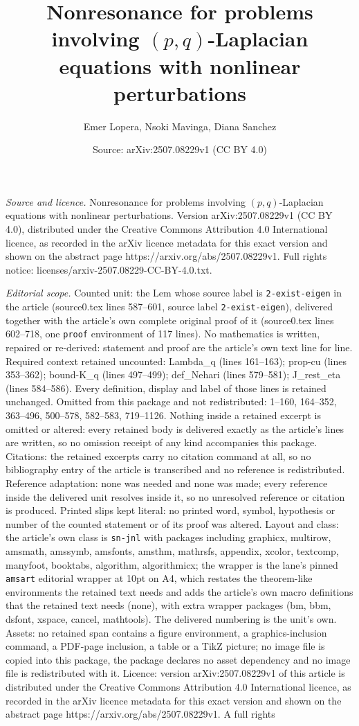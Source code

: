 \documentclass[10pt,a4paper]{amsart}
\title[Nonresonance for problems involving $(p,q)$-Laplacian equati]{Nonresonance for problems involving $(p,q)$-Laplacian equations with nonlinear perturbations}
\author{Emer Lopera, Nsoki Mavinga, Diana Sanchez}
\date{Source: arXiv:2507.08229v1 (CC BY 4.0)}
\begin{document}
\maketitle

\noindent\emph{Source and licence.} Nonresonance for problems involving $(p,q)$-Laplacian equations with nonlinear perturbations. Version arXiv:2507.08229v1 (CC BY 4.0), distributed under the Creative Commons Attribution 4.0 International licence, as recorded in the arXiv licence metadata for this exact version and shown on the abstract page https://arxiv.org/abs/2507.08229v1. Full rights notice: licenses/arxiv-2507.08229-CC-BY-4.0.txt.\par\smallskip

\noindent\textit{Editorial scope.} Counted unit: the Lem whose source label is \texttt{2-exist-eigen} in the article (source0.tex lines 587--601, source label \texttt{2-exist-eigen}), delivered together with the article's own complete original proof of it (source0.tex lines 602--718, one \texttt{proof} environment of 117 lines). No mathematics is written, repaired or re-derived: statement and proof are the article's own text line for line. Required context retained uncounted: Lambda\_q (lines 161--163); prop-cu (lines 353--362); bound-K\_q (lines 497--499); def\_Nehari (lines 579--581); J\_rest\_eta (lines 584--586). Every definition, display and label of those lines is retained unchanged. Omitted from this package and not redistributed: 1--160, 164--352, 363--496, 500--578, 582--583, 719--1126. Nothing inside a retained excerpt is omitted or altered: every retained body is delivered exactly as the article's lines are written, so no omission receipt of any kind accompanies this package. Citations: the retained excerpts carry no citation command at all, so no bibliography entry of the article is transcribed and no reference is redistributed. Reference adaptation: none was needed and none was made; every reference inside the delivered unit resolves inside it, so no unresolved reference or citation is produced. Printed slips kept literal: no printed word, symbol, hypothesis or number of the counted statement or of its proof was altered. Layout and class: the article's own class is \texttt{sn-jnl} with packages including graphicx, multirow, amsmath, amssymb, amsfonts, amsthm, mathrsfs, appendix, xcolor, textcomp, manyfoot, booktabs, algorithm, algorithmicx; the wrapper is the lane's pinned \texttt{amsart} editorial wrapper at 10pt on A4, which restates the theorem-like environments the retained text needs and adds the article's own macro definitions that the retained text needs (none), with extra wrapper packages (bm, bbm, dsfont, xspace, cancel, mathtools). The delivered numbering is the unit's own. Assets: no retained span contains a figure environment, a graphics-inclusion command, a PDF-page inclusion, a table or a TikZ picture; no image file is copied into this package, the package declares no asset dependency and no image file is redistributed with it. Licence: version arXiv:2507.08229v1 of this article is distributed under the Creative Commons Attribution 4.0 International licence, as recorded in the arXiv licence metadata for this exact version and shown on the abstract page https://arxiv.org/abs/2507.08229v1. A full rights 
\end{document}
